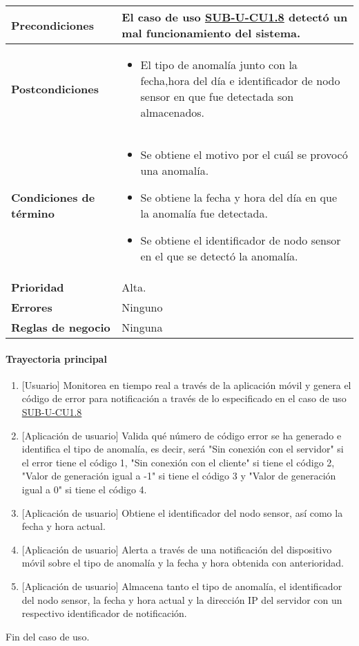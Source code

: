 \begin{longtable}{|J{5cm}|J{10.3cm}|}
	\textbf{Precondiciones} &
		El caso de uso \hyperref[SUB-U-CU1.8]{SUB-U-CU1.8} detectó un mal funcionamiento del sistema.\\ \hline
	\textbf{Postcondiciones} &
		\begin{itemize}
			\item El tipo de anomalía junto con la fecha,hora del día e identificador de nodo sensor en que fue detectada son almacenados.
		\end{itemize}\\ \hline
	\textbf{Condiciones de término} & 
		\begin{itemize}
			\item Se obtiene el motivo por el cuál se provocó una anomalía.
			\item Se obtiene la fecha y hora del día en que la anomalía fue detectada.
			\item Se obtiene el identificador de nodo sensor en el que se detectó la anomalía.
		\end{itemize} \\ \hline 
	\textbf{Prioridad} & 
		Alta. \\ \hline
	\textbf{Errores} & 
		Ninguno \\ \hline
	\textbf{Reglas de negocio} & 
		Ninguna \\ \hline

\end{longtable}

\paragraph{Trayectoria principal}
	\begin{enumerate}
		\item {[Usuario]} Monitorea en tiempo real a través de la aplicación móvil y genera el código de error para notificación a través de lo especificado en el caso de uso \hyperref[SUB-U-CU1.8]{SUB-U-CU1.8} 
		\item {[Aplicación de usuario]} Valida qué número de código error se ha generado e identifica el tipo de anomalía, es decir, será "Sin conexión con el servidor" si el error tiene el código 1, "Sin conexión con el cliente" si tiene el código 2, "Valor de generación igual a -1" si tiene el código 3 y "Valor de generación igual a 0" si tiene el código 4.
		\item {[Aplicación de usuario]} Obtiene el identificador del nodo sensor, así como la fecha y hora actual.
		\item {[Aplicación de usuario]} Alerta a través de una notificación del dispositivo móvil sobre el tipo de anomalía y la fecha y hora obtenida con anterioridad.
		\item {[Aplicación de usuario]} Almacena tanto el tipo de anomalía, el identificador del nodo sensor, la fecha y hora actual y la dirección IP del servidor con un respectivo identificador de notificación.
	\end{enumerate}
	Fin del caso de uso.
